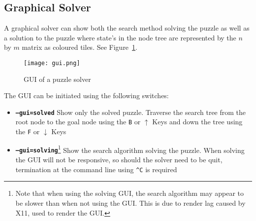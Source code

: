 \subsection{Graphical Solver}
\label{sub:Graphical Solver}

A graphical solver can show both the search method solving the puzzle
as well as a solution to the puzzle where state's in the node tree are
represented by the $n$ by $m$ matrix as coloured tiles. See Figure~\ref{fig:gui}.

\begin{figure}[h!]
  \centering
  \texttt{[image: gui.png]}
  \caption{GUI of a puzzle solver}
  \label{fig:gui}
\end{figure}

The GUI can be initiated using the following switches:

\begin{itemize}
  \item \texttt{\bfseries --gui=solved}
  Show only the solved puzzle. Traverse the search tree from the root node to
  the goal node using the \texttt{B} or $\uparrow$ Keys and down the tree using
  the \texttt{F} or $\downarrow$ Keys
  \item \texttt{\bfseries --gui=solving}\footnote{Note that when using the
  solving GUI, the search algorithm may appear to be slower than when not using
  the GUI. This is due to render lag caused by X11, used to render the GUI.}
  Show the search algorithm solving the puzzle. When solving the GUI will not be
  responsive, so should the solver need to be quit, termination at the command
  line using \texttt{\^{}C} is required
\end{itemize}
